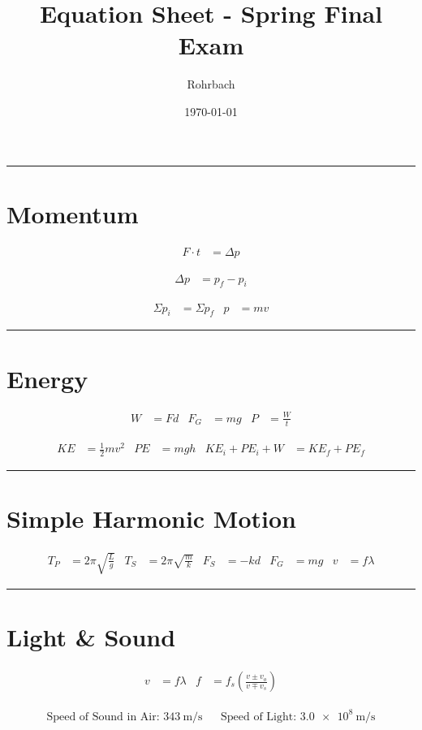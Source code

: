\documentclass[11pt]{exam}
\title{Equation Sheet - Spring Final Exam}
\author{Rohrbach}
\date{\today}
\begin{document}
\maketitle

\vs
\hrule

\section*{Momentum}

  \begin{align*}
    F \cdot t &=  \Delta p
  \end{align*}

  \begin{align*}
    \Delta p  &= p_f - p_i
  \end{align*}

  \begin{align*}
      \Sigma p_i &= \Sigma p_f
    & p &=mv
  \end{align*}


\vs
\hrule
\section*{Energy}

    
  \begin{align*}
      W   &=  Fd
    & F_G &=  mg
    & P   &=  \frac{W}{t}
  \end{align*}

  \begin{align*}
      KE    &= \frac{1}{2}mv^2 
    & PE    &= mgh
    & KE_i + PE_i + W &= KE_f + PE_f
  \end{align*}

\vs
\hrule
\section*{Simple Harmonic Motion}

    
  \begin{align*}
      T_P &=  2\pi \sqrt{\frac{L}{g}}
    & T_S &=  2\pi \sqrt{\frac{m}{k}}
    & F_S &=  -kd
    & F_G &=  mg
    & v   &=  f\lambda
  \end{align*}

\vs
\hrule
\section*{Light \& Sound}

    
  \begin{align*}
      v   &=  f\lambda
    & f   &= f_s \left( \frac{v\pm v_o}{v\mp v_s} \right)
  \end{align*}

  \begin{align*}
    \text{Speed of Sound in Air: } 
    \SI{343}{\meter\per\second}
    && \text{Speed of Light: }
    \SI{3.0e8}{\meter\per\second}
  \end{align*}
\end{document}

